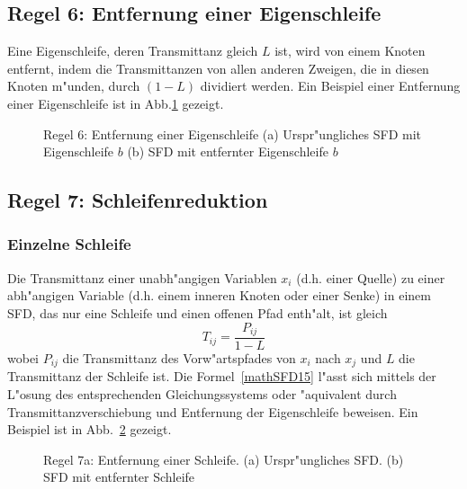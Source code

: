 \subsection{Regel 6: Entfernung einer Eigenschleife}
Eine Eigenschleife, deren Transmittanz gleich $L$ ist, wird von einem
Knoten entfernt, indem die Transmittanzen von allen anderen Zweigen,
die in diesen Knoten m"unden, durch $(1-L)$ dividiert werden. Ein
Beispiel einer Entfernung einer Eigenschleife ist in Abb.\ref{SFD14} gezeigt.\\
\begin{figure}[htb!]
\vspace*{-2mm}\begin{center}
  \caption{Regel 6:
Entfernung einer Eigenschleife (a) Urspr"ungliches SFD mit
Eigenschleife $b$ (b) SFD mit entfernter Eigenschleife $b$}\label{SFD14}
\end{center}
\vspace*{-7mm}
\end{figure}

\subsection{Regel 7: Schleifenreduktion } 
\subsubsection{Einzelne Schleife}
Die Transmittanz einer
unabh"angigen Variablen $x_i$ (d.h. einer Quelle) zu einer abh"angigen
Variable (d.h. einem inneren Knoten oder einer Senke) in einem
SFD, das nur eine Schleife und einen offenen  Pfad enth"alt,
ist gleich 
\begin{equation}
 T_{ij} = \frac{P_{ij}}{1-L} \label{mathSFD15} 
\end{equation}
wobei $P_{ij}$ die Transmittanz des
Vorw"artspfades von $x_i$ nach $x_j$ und $L$ die Transmittanz der
Schleife ist. Die Formel~\ref{mathSFD15} l"asst sich mittels der L"osung des entsprechenden Gleichungssystems oder "aquivalent durch Transmittanzverschiebung und Entfernung der Eigenschleife beweisen. Ein Beispiel ist in Abb.~\ref{SFD15} gezeigt.
\begin{figure}[htb!]
\begin{center}
  \caption{Regel 7a: Entfernung einer Schleife. (a)
Urspr"ungliches SFD. (b) SFD mit entfernter Schleife}\label{SFD15}
\end{center}
\vspace*{-7mm}
\end{figure}
